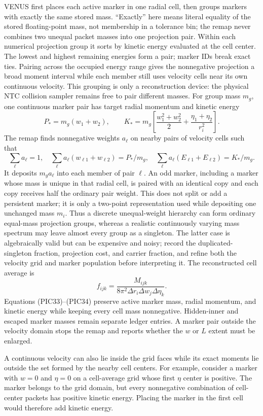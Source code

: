VENUS first places each active marker in one radial cell, then groups markers
with exactly the same stored mass.  ``Exactly'' here means literal equality
of the stored floating-point mass, not membership in a tolerance bin; the
remap never combines two unequal packet masses into one projection pair.
Within each numerical projection group it sorts by kinetic energy evaluated
at the cell center.  The lowest and highest remaining energies form a pair;
marker IDs break exact ties.  Pairing across the occupied energy range gives
the nonnegative projection a broad moment interval while each member still
uses velocity cells near its own continuous velocity.  This grouping is only
a reconstruction device: the physical NTC collision sampler remains free to
pair different masses.  For group mass \(m_g\), one continuous marker pair
has target radial momentum and kinetic energy
\[
 P_*=m_g(w_1+w_2),
 \qquad
 K_*=m_g\left[\frac{w_1^2+w_2^2}{2}
 +\frac{\eta_1+\eta_2}{r_i^2}\right].                 \tag{PIC32}
\]
The remap finds nonnegative weights \(a_\ell\) on nearby pairs of velocity
cells such that
\[
 \sum_\ell a_\ell=1,
 \quad
 \sum_\ell a_\ell(w_{\ell1}+w_{\ell2})=P_*/m_g,
 \quad
 \sum_\ell a_\ell(E_{\ell1}+E_{\ell2})=K_*/m_g.       \tag{PIC33}
\]
It deposits \(m_ga_\ell\) into each member of pair \(\ell\).  An odd marker,
including a marker whose mass is unique in that radial cell, is paired with
an identical copy and each copy receives half the ordinary pair weight.  This
does not split or add a persistent marker; it is only a two-point
representation used while depositing one unchanged mass \(m_i\).  Thus a
discrete unequal-weight hierarchy can form ordinary equal-mass projection
groups, whereas a realistic continuously varying mass spectrum may leave
almost every group as a singleton.  The latter case is algebraically valid
but can be expensive and noisy; record the duplicated-singleton fraction,
projection cost, and carrier fraction, and refine both the velocity grid and
marker population before interpreting it.  The reconstructed
cell average is
\[
 f_{ijk}=\frac{M_{ijk}}{
 8\pi^2\Delta r_i\Delta w_j\Delta\eta_k}.             \tag{PIC34}
\]
Equations (PIC33)--(PIC34) preserve active marker mass, radial momentum, and
kinetic energy while keeping every cell mass nonnegative.  Hidden-inner and
escaped marker masses remain separate ledger entries.  A marker pair outside
the velocity domain stops the remap and reports whether the \(w\) or \(L\)
extent must be enlarged.

A continuous velocity can also lie inside the grid faces while its exact
moments lie outside the set formed by the nearby cell centers.  For example,
consider a marker with \(w=0\) and \(\eta=0\) on a cell-average grid whose
first \(\eta\) center is positive.  The marker belongs to the grid domain, but
every nonnegative combination of cell-center packets has positive kinetic
energy.  Placing the marker in the first cell would therefore add kinetic
energy.

